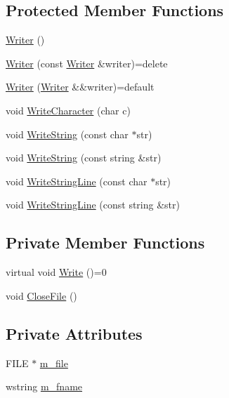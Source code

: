 \subsection*{Protected Member Functions}
\begin{DoxyCompactItemize}
\item 
\hyperlink{classmage_1_1_writer_a40b6cd3005d509e670c5a49272d9ef27}{Writer} ()
\item 
\hyperlink{classmage_1_1_writer_a2b257938508732ca0b78241aafa7922c}{Writer} (const \hyperlink{classmage_1_1_writer}{Writer} \&writer)=delete
\item 
\hyperlink{classmage_1_1_writer_a3b55e6b0202cdf8fb582c900c493b3fe}{Writer} (\hyperlink{classmage_1_1_writer}{Writer} \&\&writer)=default
\item 
void \hyperlink{classmage_1_1_writer_aa1ef04f5e69c44afda56704c2823316c}{Write\+Character} (char c)
\item 
void \hyperlink{classmage_1_1_writer_abffb25b71fc692db26abfa9dd147874e}{Write\+String} (const char $\ast$str)
\item 
void \hyperlink{classmage_1_1_writer_aaa0e62c04e6ff6c90fa73c64fc48635d}{Write\+String} (const string \&str)
\item 
void \hyperlink{classmage_1_1_writer_ad53f69e0f722c4d4b8b320ea39770c1a}{Write\+String\+Line} (const char $\ast$str)
\item 
void \hyperlink{classmage_1_1_writer_a542963963dc22cdecbdb3a29a3843ee9}{Write\+String\+Line} (const string \&str)
\end{DoxyCompactItemize}
\subsection*{Private Member Functions}
\begin{DoxyCompactItemize}
\item 
virtual void \hyperlink{classmage_1_1_writer_a9baf695ef7f6180bef883f60bcb3ac07}{Write} ()=0
\item 
void \hyperlink{classmage_1_1_writer_a82455a4fd68a97a4f1f48b90e43539e6}{Close\+File} ()
\end{DoxyCompactItemize}
\subsection*{Private Attributes}
\begin{DoxyCompactItemize}
\item 
F\+I\+LE $\ast$ \hyperlink{classmage_1_1_writer_a04428b72245b50d45c62cbd23c2f039a}{m\+\_\+file}
\item 
wstring \hyperlink{classmage_1_1_writer_afa271ee47897d4961e9d62132d8faeb5}{m\+\_\+fname}
\end{DoxyCompactItemize}


